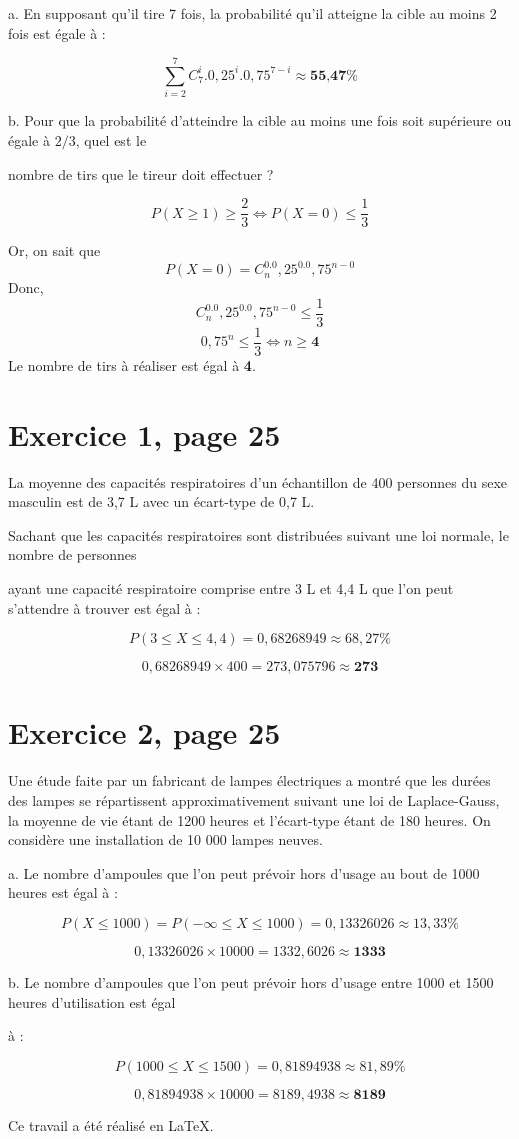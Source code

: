 \documentclass[10pt]{article}
\begin{document}
a. En supposant qu'il tire 7 fois, la probabilité qu'il atteigne la cible au moins 2 fois est égale à :

$$\sum_{i=2}^7C_7^i.0,25^i.0,75^{7-i}\approx\textbf{55,47\%}$$

b. Pour que la probabilité d'atteindre la cible au moins une fois soit supérieure ou égale à $2/3$, quel est le 

nombre de tirs que le tireur doit effectuer ?\vspace{2pt}

$$P(X\geq1)\geq\frac{2}{3}\Leftrightarrow P(X=0)\leq\frac{1}{3}$$
\begin{center} Or, on sait que
$$P(X=0)=C_n^0.0,25^0.0,75^{n-0}$$
Donc,
$$C_n^0.0,25^0.0,75^{n-0}\leq\frac{1}{3}$$
$$0,75^n\leq\frac{1}{3}\Leftrightarrow n\geq\textbf{4}$$
Le nombre de tirs à réaliser est égal à \textbf{4}.\end{center}
\section*{Exercice 1, page 25}
La moyenne des capacités respiratoires d'un échantillon de 400 personnes du sexe masculin est de 3,7 L avec un écart-type de 0,7 L.

Sachant que les capacités respiratoires sont distribuées suivant une loi normale, le nombre de personnes 

ayant une capacité respiratoire comprise entre 3 L et 4,4 L que l'on peut s'attendre à trouver est égal à :

$$P(3\leq X\leq 4,4)=0,68268949\approx 68,27\%$$

$$0,68268949\times400=273,075796\approx \textbf{273}$$

\section*{Exercice 2, page 25}
Une étude faite par un fabricant de lampes électriques a montré que les durées des lampes se répartissent approximativement suivant une loi de Laplace-Gauss, la moyenne de vie étant de 1200 heures et l’écart-type étant de 180 heures. On considère une installation de 10 000 lampes neuves.

a. Le nombre d'ampoules que l'on peut prévoir hors d'usage au bout de 1000 heures est égal à :

$$P(X\leq1000)=P(-\infty\leq X\leq1000)=0,13326026\approx13,33\%$$

$$0,13326026\times10000=1332,6026\approx\textbf{1333}$$
\newpage

b. Le nombre d'ampoules que l'on peut prévoir hors d'usage entre 1000 et 1500 heures d'utilisation est égal 

à :

$$P(1000\leq X\leq1500)=0,81894938\approx81,89\%$$

$$0,81894938\times10000=8189,4938\approx\textbf{8189}$$
\vspace{21cm}
\begin{center}
\vspace{1cm}Ce travail a été réalisé en \LaTeX . \vspace{0.2cm}
\end{center}
\end{document}
